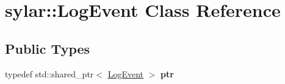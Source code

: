 \hypertarget{classsylar_1_1LogEvent}{\section{sylar\-:\-:Log\-Event Class Reference}
\label{classsylar_1_1LogEvent}
}
\subsection*{Public Types}
\begin{DoxyCompactItemize}
\item 
\hypertarget{classsylar_1_1LogEvent_a5edba5d4e7c7b90edc5585716065f497}{typedef std\-::shared\-\_\-ptr$<$ \hyperlink{classsylar_1_1LogEvent}{Log\-Event} $>$ {\bfseries ptr}}\label{classsylar_1_1LogEvent_a5edba5d4e7c7b90edc5585716065f497}

\end{DoxyCompactItemize}
